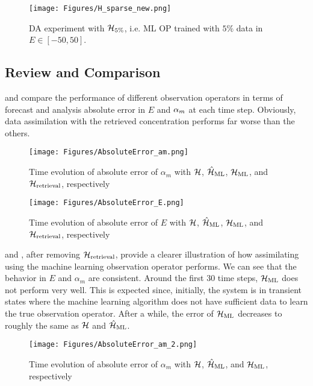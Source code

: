 \begin{figure}\label{fig:h5pDA}
\begin{center}
\texttt{[image: Figures/H\_sparse\_new.png]} 
\end{center}
\caption{DA experiment with $\mathcal{H}_{5\%}$, i.e. ML OP trained with $5\%$ data in $E\in[-50,50]$.}
\end{figure}

\subsection{Review and Comparison}
\par {} and  compare the performance of different observation operators in terms of forecast and analysis absolute error in $E$ and $\alpha_m$ at each time step. Obviously, data assimilation with the retrieved concentration performs far worse than the others. 

\begin{figure}\label{fig:error_am_1}
\centering
\texttt{[image: Figures/AbsoluteError\_am.png]}
\caption{Time evolution of absolute error of $\alpha_m$ with $\mathcal{H}$, $\hat{\mathcal{H}}_{\text{ML}}$, $\mathcal{H}_{\text{ML}}$, and $\mathcal{H}_{\text{retrieval}}$, respectively}
\end{figure}

\begin{figure}\label{fig:error_E_1}
\centering
\texttt{[image: Figures/AbsoluteError\_E.png]}
\caption{Time evolution of absolute error of $E$ with $\mathcal{H}$, $\hat{\mathcal{H}}_{\text{ML}}$, $\mathcal{H}_{\text{ML}}$, and $\mathcal{H}_{\text{retrieval}}$, respectively}
\end{figure}

\par {} and , after removing $\mathcal{H}_{\text{retrieval}}$, provide a clearer illustration of how assimilating using the machine learning observation operator performs. We can see that the behavior in $E$ and $\alpha_m$ are consistent. Around the first 30 time steps, $\mathcal{H}_{\text{ML}}$ does not perform very well. This is expected since, initially, the system is in transient states where the machine learning algorithm does not have sufficient data to learn the true observation operator. After a while, the error of $\mathcal{H}_{\text{ML}}$ decreases to roughly the same as $\mathcal{H}$ and $\hat{\mathcal{H}}_{\text{ML}}$.

\begin{figure}\label{fig:error_am_2}
\centering
\texttt{[image: Figures/AbsoluteError\_am\_2.png]}
\caption{Time evolution of absolute error of $\alpha_m$ with $\mathcal{H}$, $\hat{\mathcal{H}}_{\text{ML}}$, and $\mathcal{H}_{\text{ML}}$, respectively}
\end{figure}

